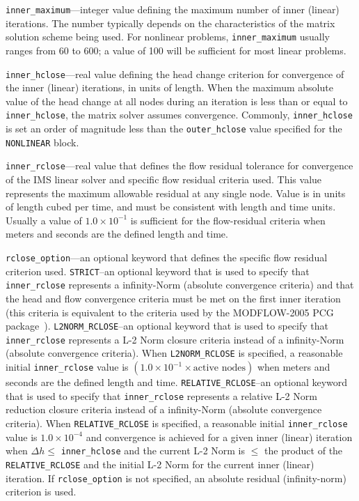 \begin{description}
\item \texttt{inner\_maximum}---integer value defining the maximum number of inner (linear) iterations. The number typically depends on the characteristics of the matrix solution scheme being used. For nonlinear problems, \texttt{inner\_maximum} usually ranges from 60 to 600; a value of 100 will be sufficient for most linear problems.

\item \texttt{inner\_hclose}---real value defining the head change criterion for convergence of the inner (linear) iterations, in units of length. When the maximum absolute value of the head change at all nodes during an iteration is less than or equal to \texttt{inner\_hclose}, the matrix solver assumes convergence. Commonly, \texttt{inner\_hclose} is set an order of magnitude less than the \texttt{outer\_hclose} value specified for the \texttt{NONLINEAR} block.

\item \texttt{inner\_rclose}---real value that defines the flow residual tolerance for convergence of the IMS linear solver and specific flow residual criteria used. This value represents the maximum allowable residual at any single node.  Value is in units of length cubed per time, and must be consistent with \mf length and time units. Usually a value of $1.0 \times 10^{-1}$ is sufficient for the flow-residual criteria when meters and seconds are the defined \mf length and time.

\item \texttt{rclose\_option}---an optional keyword that defines the specific flow residual criterion used.  \texttt{STRICT}--an optional keyword that is used to specify that \texttt{inner\_rclose} represents a infinity-Norm (absolute convergence criteria) and that the head and flow convergence criteria must be met on the first inner iteration (this criteria is equivalent to the criteria used by the MODFLOW-2005 PCG package~\citep{hill1990preconditioned}). \texttt{L2NORM\_RCLOSE}--an optional keyword that is used to specify that \texttt{inner\_rclose} represents a L-2 Norm closure criteria instead of a infinity-Norm (absolute convergence criteria). When \texttt{L2NORM\_RCLOSE} is specified, a reasonable initial \texttt{inner\_rclose} value is $\left( 1.0 \times 10^{-1} \times \text{active nodes} \right)$ when meters and seconds are the defined \mf length and time.  \texttt{RELATIVE\_RCLOSE}--an optional keyword that is used to specify that \texttt{inner\_rclose} represents a relative L-2 Norm reduction closure criteria instead of a infinity-Norm (absolute convergence criteria). When \texttt{RELATIVE\_RCLOSE} is specified, a reasonable initial \texttt{inner\_rclose} value is $1.0 \times 10^{-4}$ and convergence is achieved for a given inner (linear) iteration when $\Delta h \le$ \texttt{inner\_hclose} and the current L-2 Norm is $\le$ the product of the \texttt{RELATIVE\_RCLOSE} and the initial L-2 Norm for the current inner (linear) iteration. If \texttt{rclose\_option} is not specified, an absolute residual (infinity-norm) criterion is used.


\end{description}
